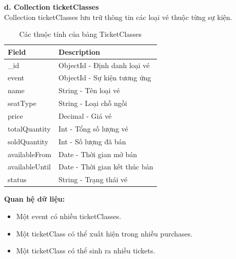 \textbf{d. Collection ticketClasses}\\
Collection ticketClasses lưu trữ thông tin các loại vé thuộc từng sự kiện.
\setlength{\LTleft}{0pt}
\setlength{\LTright}{0pt}
\begin{longtable}{|p{4cm}|p{11.2cm}|}
\caption{Các thuộc tính của bảng TicketClasses}\\[15pt]
\hline
\textbf{Field} & \textbf{Description} \\ \hline
\_id & ObjectId - Định danh loại vé \\ \hline
event & ObjectId - Sự kiện tương ứng \\ \hline
name & String - Tên loại vé \\ \hline
seatType & String - Loại chỗ ngồi \\ \hline
price & Decimal - Giá vé \\ \hline
totalQuantity & Int - Tổng số lượng vé \\ \hline
soldQuantity & Int - Số lượng đã bán \\ \hline
availableFrom & Date - Thời gian mở bán \\ \hline
availableUntil & Date - Thời gian kết thúc bán \\ \hline
status & String - Trạng thái vé \\ \hline
\end{longtable}
\textbf{Quan hệ dữ liệu:}
\begin{itemize}
    \item[-] Một event có nhiều ticketClasses.
    \item[-] Một ticketClass có thể xuất hiện trong nhiều purchases.
    \item[-] Một ticketClass có thể sinh ra nhiều tickets.
\end{itemize}

